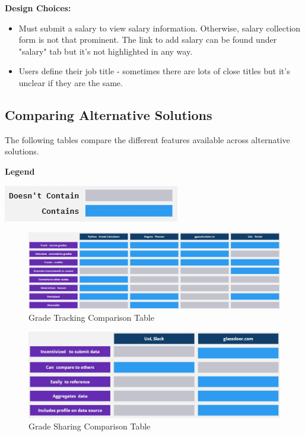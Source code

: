 \documentclass{article}
\begin{document}
\noindent \textbf{Design Choices:}
\begin{itemize}
\item Must submit a salary to view salary information. Otherwise, salary collection form is not that prominent. The link to add salary can be found under "salary" tab but it's not highlighted in any way.
\item Users define their job title - sometimes there are lots of close titles but it's unclear if they are the same.
\end{itemize}
\medskip

\subsection{Comparing Alternative Solutions}
The following tables compare the different features available across alternative solutions.
\medskip

\noindent \textbf{Legend}

\noindent \includegraphics{comparison-legend}
\medskip

\begin{figure}[h]
\noindent \includegraphics[width=\textwidth]{comparison-table-tracking}
\caption{Grade Tracking Comparison Table}
\label{fig: comparison-table1}
\end{figure}
\medskip

\begin{figure}[h]
\noindent \includegraphics[width=\textwidth]{comparison-table-sharing}
\caption{Grade Sharing Comparison Table}
\label{fig: comparison-table2}
\end{figure}
\end{document}
